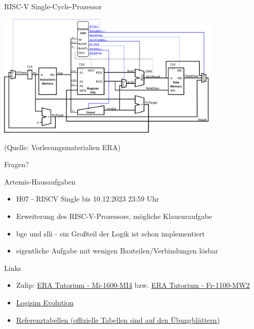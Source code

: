 \documentclass[
  german,            %
  aspectratio=169,    %
]{tumbeamer}
\begin{document}
\begin{frame}[c]{RISC-V Single-Cycle-Prozessor}{}
  \begin{center}
    \includegraphics[width=0.8\textwidth]{w07_single_cycle.png}
  \end{center}
  \centering
  \tiny (Quelle: Vorlesungsmaterialien ERA)
\end{frame}


\begin{frame}[c]{}{}
  \begin{center}
    \LARGE Fragen?
  \end{center}
\end{frame}

\begin{frame}[c, fragile]{Artemis-Hausaufgaben}{}
  \begin{itemize}
    \item H07 - RISCV Single bis 10.12.2023 23:59 Uhr
    \item Erweiterung des RISC-V-Prozessors, mögliche Klausuraufgabe
    \item bge und slli - ein Großteil der Logik ist schon implementiert
    \item eigentliche Aufgabe mit wenigen Bauteilen/Verbindungen lösbar
  \end{itemize}
\end{frame}

\begin{frame}[fragile, c]{Links}{}
  \begin{itemize}
    \item Zulip: \href{https://zulip.in.tum.de/#narrow/stream/1917-ERA-Tutorium---Mi-1600-MI4}{\glqq ERA Tutorium - Mi-1600-MI4\grqq}
          bzw. \href{https://zulip.in.tum.de/#narrow/stream/1940-ERA-Tutorium---Fr-1100-MW2}{\glqq ERA Tutorium - Fr-1100-MW2\grqq}
    \item \href{https://github.com/logisim-evolution/logisim-evolution/releases}{Logisim Evolution}
    \item \href{https://courses.edx.org/assets/courseware/v1/f06a2dc0c856f60ec0711e9f5e1c98cf/asset-v1:HarveyMuddX+ENGR85B+1T2023+type@asset+block/FinalReferences.pdf}{Referenztabellen (offizielle Tabellen sind auf den Übungblättern)}
  \end{itemize}
\end{frame}

\maketitle
\end{document}
